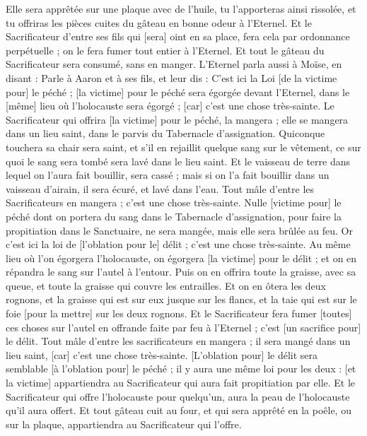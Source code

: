 \begin{multicols}{2}
Elle sera apprêtée sur une plaque avec de l'huile, tu l'apporteras ainsi rissolée, et tu offriras les pièces cuites du gâteau en bonne odeur à l'Eternel.
Et le Sacrificateur d'entre ses fils qui [sera] oint en sa place, fera cela par ordonnance perpétuelle ; on le fera fumer tout entier à l'Eternel.
Et tout le gâteau du Sacrificateur sera consumé, sans en manger.
L'Eternel parla aussi à Moïse, en disant :
Parle à Aaron et à ses fils, et leur dis : C'est ici la Loi [de la victime pour] le péché ; [la victime] pour le péché sera égorgée devant l'Eternel, dans le [même] lieu où l'holocauste sera égorgé ; [car] c'est une chose très-sainte.
Le Sacrificateur qui offrira [la victime] pour le péché, la mangera ; elle se mangera dans un lieu saint, dans le parvis du Tabernacle d'assignation.
Quiconque touchera sa chair sera saint, et s'il en rejaillit quelque sang sur le vêtement, ce sur quoi le sang sera tombé sera lavé dans le lieu saint.
Et le vaisseau de terre dans lequel on l'aura fait bouillir, sera cassé ; mais si on l'a fait bouillir dans un vaisseau d'airain, il sera écuré, et lavé dans l'eau.
Tout mâle d'entre les Sacrificateurs en mangera ; c'est une chose très-sainte.
Nulle [victime pour] le péché dont on portera du sang dans le Tabernacle d'assignation, pour faire la propitiation dans le Sanctuaire, ne sera mangée, mais elle sera brûlée au feu.
\VerseOne{}Or c'est ici la loi de [l'oblation pour le] délit ; c'est une chose très-sainte.
Au même lieu où l'on égorgera l'holocauste, on égorgera [la victime] pour le délit ; et on en répandra le sang sur l'autel à l'entour.
Puis on en offrira toute la graisse, avec sa queue, et toute la graisse qui couvre les entrailles.
Et on en ôtera les deux rognons, et la graisse qui est sur eux jusque sur les flancs, et la taie qui est sur le foie [pour la mettre] sur les deux rognons.
Et le Sacrificateur fera fumer [toutes] ces choses sur l'autel en offrande faite par feu à l'Eternel ; c'est [un sacrifice pour] le délit.
Tout mâle d'entre les sacrificateurs en mangera ; il sera mangé dans un lieu saint, [car] c'est une chose très-sainte.
[L'oblation pour] le délit sera semblable [à l'oblation pour] le péché ; il y aura une même loi pour les deux : [et la victime] appartiendra au Sacrificateur qui aura fait propitiation par elle.
Et le Sacrificateur qui offre l'holocauste pour quelqu'un, aura la peau de l'holocauste qu'il aura offert.
Et tout gâteau cuit au four, et qui sera apprêté en la poêle, ou sur la plaque, appartiendra au Sacrificateur qui l'offre.

\end{multicols}
